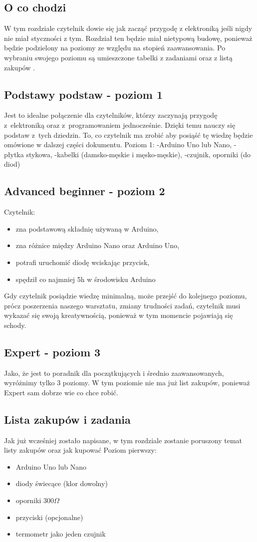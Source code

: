\subsection{ O co chodzi }
W tym rozdziale czytelnik dowie się jak zacząć przygodę z elektroniką jeśli nigdy nie miał styczności z tym. Rozdział ten będzie miał
nietypową budowę, ponieważ będzie podzielony na poziomy ze względu na stopień zaawansowania. Po wybraniu swojego poziomu są umieszczone tabelki z zadaniami oraz z listą zakupów .
\subsection{Podstawy podstaw - poziom 1}
Jest to idealne połączenie dla czytelników, którzy zaczynają przygodę z~elektroniką oraz z~programowaniem jednocześnie. Dzięki temu nauczy się podstaw z~tych dziedzin. 
To, co czytelnik ma zrobić aby posiąść tę wiedzę będzie omówione w dalszej części dokumentu.
Poziom 1:
-Arduino Uno lub Nano,
-płytka stykowa,
-kabelki (damsko-męskie i męsko-męskie),
-czujnik, oporniki (do diod)
\subsection{Advanced beginner - poziom 2}
Czytelnik:
\begin{itemize}
\item zna podstawową składnię używaną w Arduino,
\item zna różnice między Arduino Nano oraz Arduino Uno,
\item potrafi uruchomić diodę wciskając przycisk,
\item spędził co najmniej 5h w środowisku Arduino
\end{itemize}

Gdy czytelnik posiądzie wiedzę minimalną, może przejść do kolejnego poziomu, prócz poszerzenia naszego warsztatu, zmiany trudności zadań, czytelnik musi wykazać się swoją kreatywnością, ponieważ w tym momencie pojawiają się schody.

\subsection{Expert - poziom 3}
Jako, że jest to poradnik dla początkujących i średnio zaawansowanych, wyróżnimy tylko 3 poziomy. W tym poziomie nie ma już list zakupów, ponieważ Expert sam dobrze wie co chce robić.
\subsection{Lista zakupów i zadania}
Jak już wcześniej zostało napisane, w tym rozdziale zostanie poruszony temat listy zakupów oraz jak kupować
Poziom pierwszy:
\begin{itemize}
\item Arduino Uno lub Nano
\item diody świecące (klor dowolny)
\item oporniki $300\Omega$
\item przyciski (opcjonalne)
\item termometr jako jeden czujnik
 \end{itemize}

